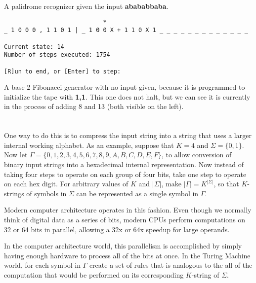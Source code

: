 \documentclass{article}
\begin{document}
A palidrome recognizer given the input \textbf{abababbaba}.

\vspace{3em}

\begin{verbatim}
                            *
_ 1 0 0 0 , 1 1 0 1 | _ 1 0 0 X + 1 1 0 X 1 _ _ _ _ _ _ _ _ _ _ _ _ _

Current state: 14
Number of steps executed: 1754

[R]un to end, or [Enter] to step: 
\end{verbatim}

A base 2 Fibonacci generator with no input given, because it is programmed to
initialize the tape with \textbf{1,1}. This one does not halt, but we can
see it is currently in the process of adding 8 and 13 (both visible on the 
left).

\section{}

\section{}
One way to do this is to compress the input string into a string that uses a
larger internal working alphabet.
As an example, suppose that $K = 4$ and $\Sigma = \{0,1\}$. Now let
$\Gamma = \{0,1,2,3,4,5,6,7,8,9,A,B,C,D,E,F\}$, to allow conversion of binary
input strings into a hexadecimal internal representation. Now instead of taking
four steps to operate on each group of four bits, take one step to operate on
each hex digit. For arbitrary values of $K$ and $|\Sigma|$, make
$|\Gamma| = K^{|\Sigma|}$, so that $K$-strings of symbols in $\Sigma$ can be
represented as a single symbol in $\Gamma$. 

\vspace{1em}

Modern computer architecture operates in this fashion. Even though we normally
think of digital data as a series of bits, modern CPUs perform computations on
32 or 64 bits in parallel, allowing a 32x or 64x speedup for large operands.

\vspace{1em}

In the computer architecture world, this parallelism is accomplished by simply
having enough hardware to process all of the bits at once. In
the Turing Machine world, for each symbol in $\Gamma$ create a set of rules
that is analogous to the all of the computation that would be performed on
its corresponding $K$-string of $\Sigma$.
\end{document}
